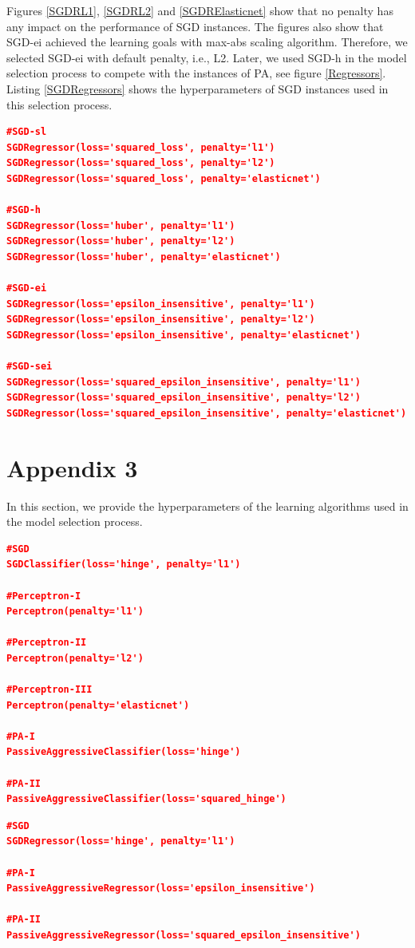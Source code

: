 \documentclass[a4paper,12pt]{article}
\begin{document}
Figures \ref{SGDRL1}, \ref{SGDRL2} and \ref{SGDRElasticnet} show that no penalty has any impact on the performance of SGD instances. The figures also show that SGD-ei achieved the learning goals with max-abs scaling algorithm. Therefore, we selected SGD-ei with default penalty, i.e., L2. Later, we used SGD-h in the model selection process to compete with the instances of PA, see figure \ref{Regressors}. Listing \ref{SGDRegressors} shows the hyperparameters of SGD instances used in this selection process.
\begin{lstlisting}[language=json, caption=Hyperparameters of SGD instances for regression, label=SGDRegressors]
#SGD-sl
SGDRegressor(loss='squared_loss', penalty='l1')
SGDRegressor(loss='squared_loss', penalty='l2')
SGDRegressor(loss='squared_loss', penalty='elasticnet')

#SGD-h
SGDRegressor(loss='huber', penalty='l1')
SGDRegressor(loss='huber', penalty='l2')
SGDRegressor(loss='huber', penalty='elasticnet')

#SGD-ei
SGDRegressor(loss='epsilon_insensitive', penalty='l1')
SGDRegressor(loss='epsilon_insensitive', penalty='l2')
SGDRegressor(loss='epsilon_insensitive', penalty='elasticnet')

#SGD-sei
SGDRegressor(loss='squared_epsilon_insensitive', penalty='l1')
SGDRegressor(loss='squared_epsilon_insensitive', penalty='l2')
SGDRegressor(loss='squared_epsilon_insensitive', penalty='elasticnet')
\end{lstlisting}
\newpage
\section{Appendix 3} \label{Hyperparameters}
In this section, we provide the hyperparameters of the learning algorithms used in the model selection process.
\begin{lstlisting}[language=json, caption=Hyperparameters of the learning algorithms for classification, label=ClassifiersSettings]
#SGD
SGDClassifier(loss='hinge', penalty='l1')

#Perceptron-I
Perceptron(penalty='l1')

#Perceptron-II
Perceptron(penalty='l2')

#Perceptron-III
Perceptron(penalty='elasticnet')

#PA-I
PassiveAggressiveClassifier(loss='hinge')

#PA-II
PassiveAggressiveClassifier(loss='squared_hinge')
\end{lstlisting}
\begin{lstlisting}[language=json, caption=Hyperparameters of the learning algorithms for regression, label=RegressorsSettings]
#SGD
SGDRegressor(loss='hinge', penalty='l1')

#PA-I
PassiveAggressiveRegressor(loss='epsilon_insensitive')

#PA-II
PassiveAggressiveRegressor(loss='squared_epsilon_insensitive')
\end{lstlisting}
\end{document}
